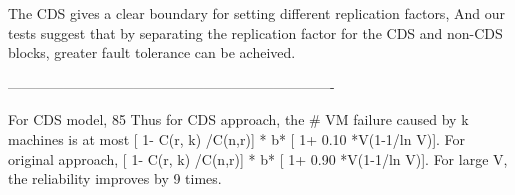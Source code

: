 {The CDS gives a clear boundary for setting different replication factors,
And our tests suggest that by separating the replication factor for the CDS
and non-CDS blocks, greater fault tolerance can be acheived.

----------------------------------------------------------------------

For CDS model, 85%
Thus  for CDS approach,   the # VM failure caused by k machines is at most  [ 1-  C(r, k) /C(n,r)] * b* [ 1+ 0.10 *V(1-1/ln V)].
For original approach,  [ 1-  C(r, k) /C(n,r)] * b* [ 1+ 0.90 *V(1-1/ln V)].
For large V, the reliability improves by 9 times.
}
